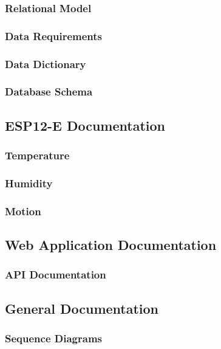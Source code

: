 \documentclass[
    a4paper,
    12pt,
    headings=normal
]{scrreprt}
\begin{document}
            \subsubsection{Relational Model}
            \subsubsection{Data Requirements}
            \subsubsection{Data Dictionary}
            \subsubsection{Database Schema}

        \newpage
        \subsection{ESP12-E Documentation}
            \subsubsection{Temperature}
            \subsubsection{Humidity}
            \subsubsection{Motion}

        \newpage
        \subsection{Web Application Documentation}
            \subsubsection{API Documentation}

        \newpage
        \subsection{General Documentation}
            \subsubsection{Sequence Diagrams}
\end{document}
